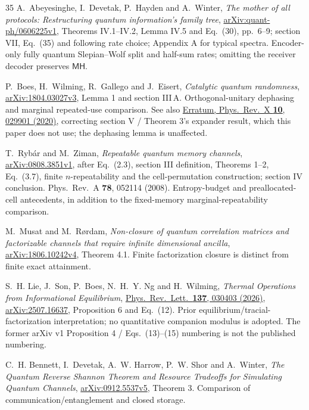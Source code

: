 \documentclass[11pt,a4paper]{article}
\numberwithin{equation}{section}
\theoremstyle{plain}
\theoremstyle{definition}
\newcommand{\rg}[1]{\mathsf{#1}}
\begin{document}
\begin{thebibliography}{35}
A.~Abeyesinghe, I.~Devetak, P.~Hayden and A.~Winter, \emph{The mother of all
protocols: Restructuring quantum information's family tree},
\href{https://arxiv.org/pdf/quant-ph/0606225v1}{arXiv:quant-ph/0606225v1},
Theorems IV.1--IV.2, Lemma IV.5 and Eq.~(30), pp.~6--9; section VII, Eq.~(35)
and following rate choice; Appendix A for typical spectra. Encoder-only fully
quantum Slepian--Wolf split and half-sum rates; omitting the receiver decoder
preserves $\rg{M}\rg{H}$.

P.~Boes, H.~Wilming, R.~Gallego and J.~Eisert, \emph{Catalytic quantum
randomness}, \href{https://arxiv.org/pdf/1804.03027v3}{arXiv:1804.03027v3},
Lemma 1 and section III\,A. Orthogonal-unitary dephasing and marginal
repeated-use comparison. See also
\href{https://journals.aps.org/prx/pdf/10.1103/PhysRevX.10.029901}{Erratum,
Phys.\ Rev.\ X \textbf{10}, 029901 (2020)}, correcting section V / Theorem 3's
expander result, which this paper does not use; the dephasing lemma is
unaffected.

T.~Ryb\'ar and M.~Ziman, \emph{Repeatable quantum memory channels},
\href{https://arxiv.org/pdf/0808.3851v1}{arXiv:0808.3851v1}, after Eq.~(2.3),
section III definition, Theorems 1--2, Eq.~(3.7), finite $n$-repeatability and
the cell-permutation construction; section IV conclusion.
Phys.\ Rev.\ A \textbf{78}, 052114 (2008). Entropy-budget and preallocated-cell
antecedents, in addition to the fixed-memory marginal-repeatability comparison.

M.~Musat and M.~R\o rdam, \emph{Non-closure of quantum correlation matrices
and factorizable channels that require infinite dimensional ancilla},
\href{https://arxiv.org/html/1806.10242v4}{arXiv:1806.10242v4}, Theorem 4.1.
Finite factorization closure is distinct from finite exact attainment.

S.~H. Lie, J.~Son, P.~Boes, N.~H.~Y. Ng and H.~Wilming, \emph{Thermal
Operations from Informational Equilibrium},
\href{https://journals.aps.org/prl/pdf/10.1103/lm3h-c5f5}{Phys.\ Rev.\ Lett.\
\textbf{137}, 030403 (2026)},
\href{https://arxiv.org/abs/2507.16637}{arXiv:2507.16637}, Proposition 6 and
Eq.~(12). Prior
equilibrium/tracial-factorization interpretation; no quantitative companion
modulus is adopted. The former arXiv v1 Proposition 4 / Eqs.~(13)--(15)
numbering is not the published numbering.

C.~H. Bennett, I.~Devetak, A.~W. Harrow, P.~W. Shor and A.~Winter, \emph{The
Quantum Reverse Shannon Theorem and Resource Tradeoffs for Simulating Quantum
Channels}, \href{https://arxiv.org/html/0912.5537v5}{arXiv:0912.5537v5},
Theorem 3. Comparison of communication/entanglement and closed storage.


\end{thebibliography}
\end{document}
